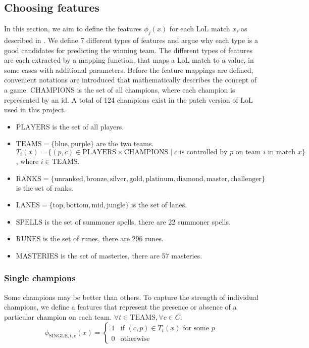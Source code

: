 \subsection{Choosing features}\label{sec:choosingfeatures}
In this section, we aim to define the features $\phi_j(x)$ for each LoL match $x$, as described in .
We define 7 different types of features and argue why each type is a good candidates for predicting the winning team.
The different types of features are each extracted by a mapping function, that maps a LoL match to a value, in some cases with additional parameters. 
Before the feature mappings are defined, convenient notations are introduced that mathematically describes the concept of a game.
$\text{CHAMPIONS}$ is the set of all champions, where each champion is represented by an id. A total of 124 champions exist in the patch version of LoL used in this project.
\begin{itemize}
\item $\text{PLAYERS}$ is the set of all players.
\item $\text{TEAMS} = \{\text{blue}, \text{purple}\}$ are the two teams.
$T_i(x) = \{ (p, c) \in \text{PLAYERS} \times \text{CHAMPIONS} \mid c \text{ is controlled by } p \text{ on team } i  \text{ in match } x \}$, where $i \in \text{TEAMS}$.
\item $\text{RANKS} = \{\text{unranked},\text{bronze},\text{silver},\text{gold},\text{platinum},\text{diamond},\text{master},\text{challenger}\}$ is the set of ranks.
\item $\text{LANES} = \{\text{top},\text{bottom},\text{mid},\text{jungle}\}$ is the set of lanes.
\item $\text{SPELLS}$ is the set of summoner spells, there are 22 summoner spells.
\item $\text{RUNES}$ is the set of runes, there are 296 runes.
\item $\text{MASTERIES}$ is the set of masteries, there are 57 masteries.
\end{itemize}

\subsubsection{Single champions}
Some champions may be better than others. To capture the strength of individual champions, we define a features that represent the presence or absence of a particular champion on each team.
$\forall t \in \text{TEAMS}, \forall c \in C:$
\begin{equation}\label{eq:single}  
\phi_{\text{SINGLE}, t, c}(x) = 
\begin{cases} 
  1 & \text{if } (c, p) \in T_t(x) \text{ for some } p \\
  0 & \text{otherwise} 
\end{cases}
\end{equation}

